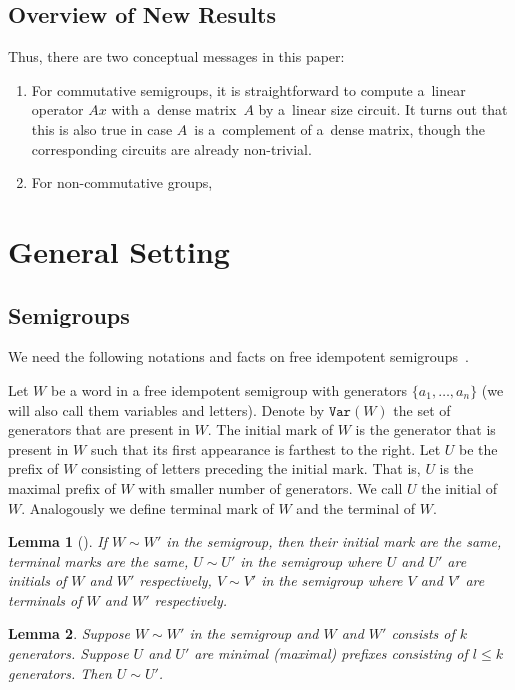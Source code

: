 \documentclass[11pt,letterpaper]{article}
\newtheorem{lemma}{Lemma}
\newcommand{\var}{\texttt{Var}}
\begin{document}
\subsection{Overview of New Results}

Thus, there are two conceptual messages in this paper:
\begin{enumerate}
\item For commutative semigroups, it is straightforward to compute a~linear operator $Ax$ with a~dense matrix~$A$ by a~linear size circuit. It turns out that this is also true in case $A$~is a~complement of a~dense matrix, though the corresponding circuits are already non-trivial.
\item For non-commutative groups,
\end{enumerate}

\section{General Setting}
\subsection{Semigroups}

We need the following notations and facts on free idempotent semigroups~\cite{GreenR52}.

Let $W$ be a word in a free idempotent semigroup with generators $\{a_1,\ldots, a_n\}$ (we will also call them variables and letters). Denote by $\var(W)$ the set of generators that are present in $W$. The initial mark of $W$ is the generator that is present in $W$ such that its first appearance is farthest to the right. Let $U$ be the prefix of $W$ consisting of letters preceding the initial mark. That is, $U$ is the maximal prefix of $W$ with smaller number of generators. We call $U$ the initial of $W$. Analogously we define terminal mark of $W$ and the terminal of $W$.

\begin{lemma}[\cite{GreenR52}] \label{lem:GR}
If $W\sim W'$ in the semigroup, then their initial mark are the same, terminal marks are the same, $U \sim U'$ in the semigroup where $U$ and $U'$ are initials of $W$ and $W'$ respectively, $V\sim V'$ in the semigroup where $V$ and $V'$ are terminals of $W$ and $W'$ respectively.
\end{lemma}

\begin{lemma} \label{lem:prefix_equivalence}
Suppose $W\sim W'$ in the semigroup and $W$ and $W'$ consists of $k$ generators. Suppose $U$ and $U'$ are minimal (maximal) prefixes consisting of $l\leq k$ generators. Then $U\sim U'$.
\end{lemma}
\end{document}
